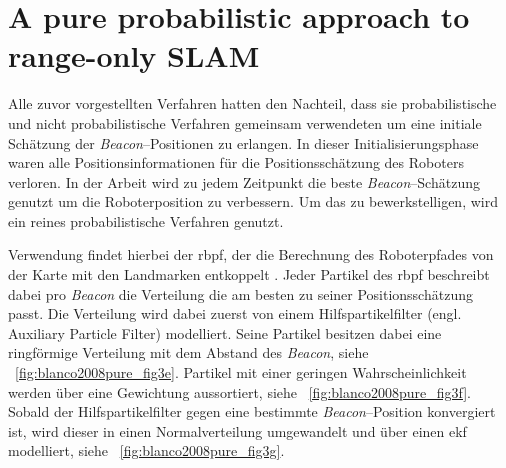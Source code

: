 \begin{comment}
------------------------------------------------------------------------------------------
-\cite{smith2004tracking}
	- Tracking moving devices with the cricket location system (547)
\end{comment}


\begin{comment}
------------------------------------------------------------------------------------------
\end{comment}
\section{A pure probabilistic approach to range-only SLAM}\label{sec:blanco2008pure}

Alle zuvor vorgestellten Verfahren hatten den Nachteil, dass sie probabilistische und nicht probabilistische Verfahren gemeinsam verwendeten um eine initiale Schätzung der \textit{Beacon}--Positionen zu erlangen. In dieser Initialisierungsphase waren alle Positionsinformationen für die Positionsschätzung des Roboters verloren. In der Arbeit  \cite{blanco2008pure} wird zu jedem Zeitpunkt die beste \textit{Beacon}--Schätzung genutzt um die Roboterposition zu verbessern. Um das zu bewerkstelligen, wird ein reines probabilistische Verfahren genutzt.

Verwendung findet hierbei der \Gls{rbpf}, der die Berechnung des Roboterpfades von der Karte mit den Landmarken entkoppelt \cite{murphy2001rao, montemerlo2002fastslam}. Jeder Partikel des \Gls{rbpf} beschreibt dabei pro \textit{Beacon} die Verteilung die am besten zu seiner Positionsschätzung passt. Die Verteilung wird dabei zuerst von einem Hilfspartikelfilter (engl. Auxiliary Particle Filter) modelliert. Seine Partikel besitzen dabei eine ringförmige Verteilung mit dem Abstand des \textit{Beacon}, siehe \figurename~\ref{fig:blanco2008pure_fig3e}. Partikel mit einer geringen Wahrscheinlichkeit werden über eine Gewichtung aussortiert, siehe \figurename~\ref{fig:blanco2008pure_fig3f}. Sobald der Hilfspartikelfilter gegen eine bestimmte \textit{Beacon}--Position konvergiert ist, wird dieser in einen Normalverteilung umgewandelt und über einen \Gls{ekf} modelliert, siehe \figurename~\ref{fig:blanco2008pure_fig3g}.

